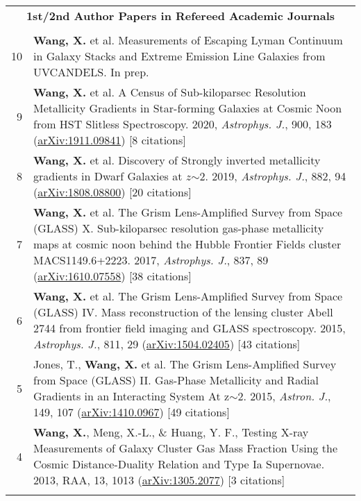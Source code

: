 \documentclass[letterpaper,12pt]{article}
\newcommand{\narrow}{-1.6ex}
\begin{document}
\begingroup
\renewcommand\arraystretch{1.2}
\begin{longtable}{rp{5.8in}}
\multicolumn{2}{c}{\textbf{1st/2nd Author Papers in Refereed Academic Journals}}      \\
\\[\narrow]
10 &  \textbf{Wang, X.} et al. Measurements of Escaping Lyman Continuum in Galaxy Stacks and Extreme Emission Line Galaxies from UVCANDELS. In prep. \\
9 &  \textbf{Wang, X.} et al. A Census of Sub-kiloparsec Resolution Metallicity Gradients in Star-forming Galaxies at Cosmic Noon from HST Slitless 
    Spectroscopy. 2020, \textit{Astrophys. J.}, 900, 183 (\href{https://arxiv.org/abs/1911.09841}{arXiv:1911.09841}) [8 citations] \\
8 &  \textbf{Wang, X.} et al. Discovery of Strongly inverted metallicity gradients in Dwarf Galaxies at $z$$\sim$2. 2019, \textit{Astrophys. J.}, 882, 
    94 (\href{https://arxiv.org/abs/1808.08800}{arXiv:1808.08800}) [20 citations]  \\
7 &  \textbf{Wang, X.} et al. The Grism Lens-Amplified Survey from Space (GLASS) X. Sub-kiloparsec resolution gas-phase metallicity maps at cosmic 
    noon behind the Hubble Frontier Fields cluster MACS1149.6+2223. 2017, \textit{Astrophys. J.}, 837, 89 (\href{http://arxiv.org/abs/1610.07558}
    {arXiv:1610.07558}) [38 citations]    \\
6 &  \textbf{Wang, X.} et al. The Grism Lens-Amplified Survey from Space (GLASS) IV. Mass reconstruction of the lensing cluster Abell 2744 from 
    frontier field imaging and GLASS spectroscopy. 2015, \textit{Astrophys. J.}, 811, 29 (\href{http://arxiv.org/abs/1504.02405}{arXiv:1504.02405}) 
    [43 citations] \\
5 &  Jones, T., \textbf{Wang, X.} et al. The Grism Lens-Amplified Survey from Space (GLASS) II. Gas-Phase Metallicity and Radial Gradients in an 
    Interacting System At z$\sim$2. 2015, \textit{Astron. J.}, 149, 107 (\href{http://arxiv.org/abs/1410.0967}{arXiv:1410.0967}) [49 citations] \\
4 &  \textbf{Wang, X.}, Meng, X.-L., \& Huang, Y. F., Testing X-ray Measurements of Galaxy Cluster Gas Mass Fraction Using the Cosmic Distance-Duality 
    Relation and Type Ia Supernovae. 2013, RAA, 13, 1013 (\href{http://arxiv.org/abs/1305.2077}{arXiv:1305.2077}) [3 citations] \\
$$
\end{longtable}
\end{document}
